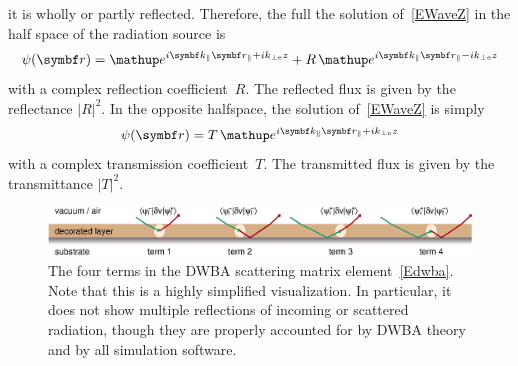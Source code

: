 it is wholly or partly reflected.
Therefore, the full the solution of~\cref{EWaveZ} in the half space
of the radiation source is
\begin{equation}\label{Eref1}
  \psi(\r) = \e^{i\k_\parallel\r_\parallel+ik_{\perp\se} z} +
      R\, \e^{i\k_\parallel\r_\parallel-ik_{\perp\se} z}
\end{equation}
with a complex reflection coefficient~$R$.
%
The reflected flux is given by the re\-flect\-an\-ce $|R|^2$.
%
%
In the opposite halfspace, the solution of~\cref{EWaveZ} is simply
\begin{equation}\label{Etra1}
  \psi(\r) = T\, \e^{i\k_\parallel\r_\parallel+ik_{\perp\se} z}
\end{equation}
with a complex transmission coefficient~$T$.
The transmitted flux is given by the transmittance $|T|^2$.
%
%

\begin{figure}[tb]
\begin{center}
\includegraphics[width=1\textwidth]{fig/drawing/dwba_4terms.ps}
\end{center}
\caption{The four terms in the DWBA scattering matrix element~\cref{Edwba}.
Note that this is a highly simplified visualization.
In particular, it does not show multiple reflections
%
%
of incoming or scattered radiation,
though they are properly accounted for by DWBA theory and by all simulation software.}
\label{Fdwba4terms}
\end{figure}

